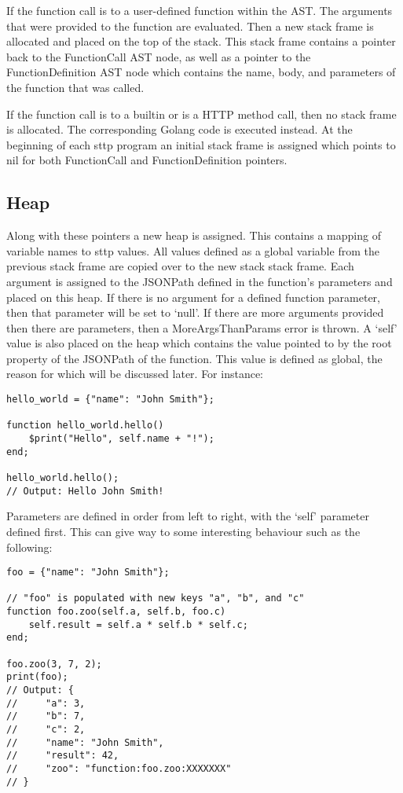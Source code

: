 If the function call is to a user-defined function within the AST. The arguments that were provided to the function are evaluated. Then a new stack frame is allocated and placed on the top of the stack. This stack frame contains a pointer back to the FunctionCall AST node, as well as a pointer to the FunctionDefinition AST node which contains the name, body, and parameters of the function that was called.

If the function call is to a builtin or is a HTTP method call, then no stack frame is allocated. The corresponding Golang code is executed instead. At the beginning of each sttp program an initial stack frame is assigned which points to nil for both FunctionCall and FunctionDefinition pointers.

\subsection{Heap}

Along with these pointers a new heap is assigned. This contains a mapping of variable names to sttp values. All values defined as a global variable from the previous stack frame are copied over to the new stack stack frame. Each argument is assigned to the JSONPath defined in the function's parameters and placed on this heap. If there is no argument for a defined function parameter, then that parameter will be set to `null'. If there are more arguments provided then there are parameters, then a MoreArgsThanParams error is thrown. A `self' value is also placed on the heap which contains the value pointed to by the root property of the JSONPath of the function. This value is defined as global, the reason for which will be discussed later. For instance:

\begin{verbatim}
hello_world = {"name": "John Smith"};

function hello_world.hello()
    $print("Hello", self.name + "!");
end;

hello_world.hello();
// Output: Hello John Smith!
\end{verbatim}

Parameters are defined in order from left to right, with the `self' parameter defined first. This can give way to some interesting behaviour such as the following:

\begin{verbatim}
foo = {"name": "John Smith"};

// "foo" is populated with new keys "a", "b", and "c"
function foo.zoo(self.a, self.b, foo.c)
    self.result = self.a * self.b * self.c;
end;

foo.zoo(3, 7, 2);
print(foo);
// Output: {
//     "a": 3,
//     "b": 7,
//     "c": 2,
//     "name": "John Smith",
//     "result": 42,
//     "zoo": "function:foo.zoo:XXXXXXX"
// }
\end{verbatim}

